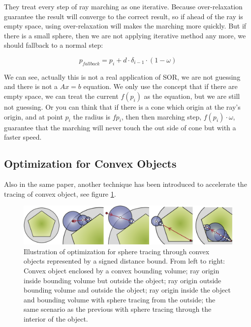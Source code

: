 They treat every step of ray marching as one iterative. Because over-relaxation guarantee the result will converge to the correct result, so if ahead of the ray is empty space, using over-relaxation will makes the marching more quickly. But if there is a small sphere, then we are not applying iterative method any more, we should fallback to a normal step:

\begin{equation}
	p_{fallback}=p_{i}+d\cdot\delta_{i-1}\cdot(1-\omega)
\end{equation}

We can see, actually this is not a real application of SOR, we are not guessing and there is not a $Ax=b$ equation. We only use the concept that if there are empty space, we can treat the current $f(p_{i})$ as the equation, but we are still not guessing. Or you can think that if there is a cone which origin at the ray's origin, and at point $p_{i}$ the radius is $f{p_{i}}$, then then marching step, $f(p_{i})\cdot\omega$, guarantee that the marching will never touch the out side of cone but with a faster speed.
 

 
\subsection{Optimization for Convex Objects}
Also in the same paper, another technique has been introduced to accelerate the tracing of convex object, see figure \ref{f:convex-objects}.

\begin{figure}\label{f:convex-objects}
	\includegraphics[width=1.0\textwidth]{graphics/df/Optimization-for-Convex-Objects}
	\caption{Illustration of optimization for sphere tracing through convex objects represented by a signed distance bound. From left to right: Convex object enclosed by a convex bounding volume; ray origin inside bounding volume but outside the object; ray origin outside bounding volume and outside the object; ray origin inside the object and bounding volume with sphere tracing from the outside; the same scenario as the previous with sphere tracing through the interior of the object.}
\end{figure}

